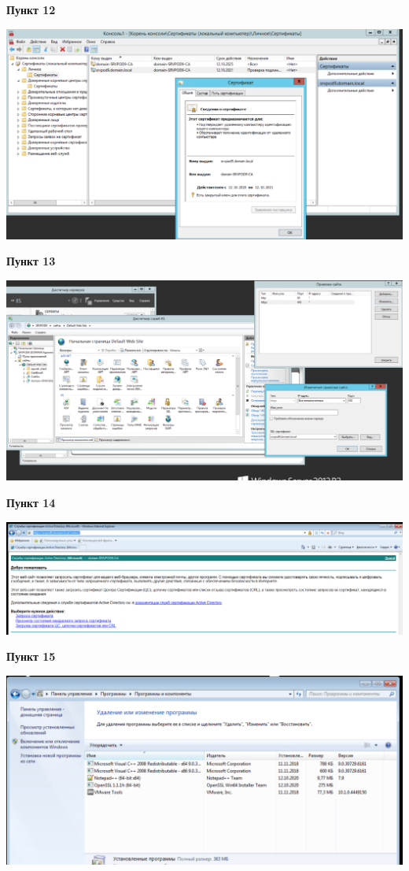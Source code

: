 \documentclass[a4paper,14pt]{extarticle}
\begin{document}
    \textbf{Пункт 12}
    \begin{center}
        \includegraphics[scale=0.4]{12}
    \end{center}
    \newpage
    \textbf{Пункт 13}
    \begin{center}
        \includegraphics[scale=0.4]{13}
    \end{center}
    \textbf{Пункт 14}
    \begin{center}
        \includegraphics[scale=0.4]{14}
    \end{center}
    \textbf{Пункт 15}
    \begin{center}
        \includegraphics[scale=0.5]{15}
    \end{center}
\end{document}
